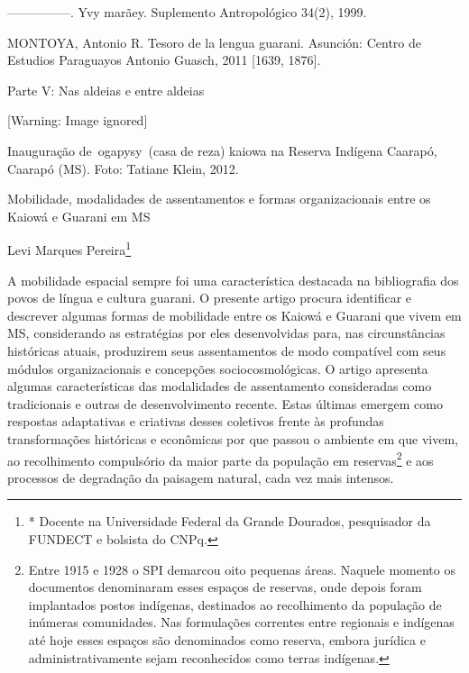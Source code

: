 \documentclass{article}
\begin{document}
{}---{}---{}---{}---{}---. Yvy mar\~aey. Suplemento Antropol\'ogico
34(2), 1999.

MONTOYA, Antonio R. Tesoro de la lengua guarani. Asunci\'on: Centro de
Estudios Paraguayos Antonio Guasch, 2011 [1639, 1876].

Parte V: Nas aldeias e entre aldeias

  [Warning: Image ignored] %
 

Inaugura\c{c}\~ao de~ogapysy~(casa de reza) kaiowa na Reserva Ind\'igena
Caarap\'o, Caarap\'o (MS). Foto: Tatiane Klein, 2012.

Mobilidade, modalidades de assentamentos e formas organizacionais entre
os Kaiow\'a e Guarani em MS

Levi Marques Pereira\footnote{* Docente na Universidade Federal da
Grande Dourados, pesquisador da FUNDECT e bolsista do CNPq.} 

A mobilidade espacial sempre foi uma caracter\'istica destacada na
bibliografia dos povos de l\'ingua e cultura guarani. O presente artigo
procura identificar e descrever algumas formas de mobilidade entre os
Kaiow\'a e Guarani que vivem em MS, considerando as estrat\'egias por
eles desenvolvidas para, nas circunst\^ancias hist\'oricas atuais,
produzirem seus assentamentos de modo compat\'ivel com seus m\'odulos
organizacionais e concep\c{c}\~oes sociocosmol\'ogicas. O artigo
apresenta algumas caracter\'isticas das modalidades de assentamento
consideradas como tradicionais e outras de desenvolvimento recente.
Estas \'ultimas emergem como respostas adaptativas e criativas desses
coletivos frente \`as profundas transforma\c{c}\~oes hist\'oricas e
econ\^omicas por que passou o ambiente em que vivem, ao recolhimento
compuls\'orio da maior parte da popula\c{c}\~ao em reservas\footnote{
Entre 1915 e 1928 o SPI demarcou oito pequenas \'areas. Naquele momento
os documentos denominaram esses espa\c{c}os de reservas, onde depois
foram implantados postos ind\'igenas, destinados ao recolhimento da
popula\c{c}\~ao de in\'umeras comunidades. Nas formula\c{c}\~oes
correntes entre regionais e ind\'igenas at\'e hoje esses espa\c{c}os
s\~ao denominados como reserva, embora jur\'idica e administrativamente
sejam reconhecidos como terras ind\'igenas.\par } e aos processos de
degrada\c{c}\~ao da paisagem natural, cada vez mais intensos.
\end{document}
